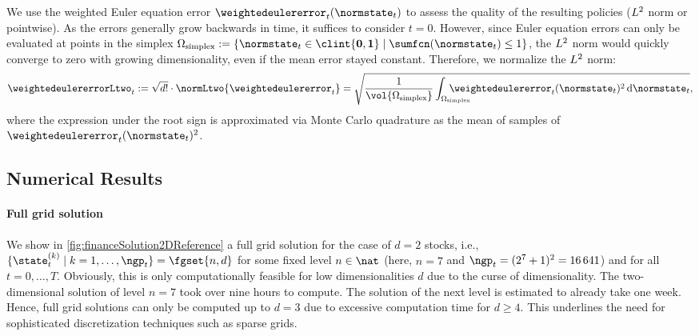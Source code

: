 We use the weighted Euler equation error
$\weightedeulererror_t(\normstate_t)$
to assess the quality of the resulting policies
($L^2$ norm or pointwise).
As the errors generally grow backwards in time,
it suffices to consider $t = 0$.
However, since Euler equation errors can only be evaluated at points in
the simplex
$
  \Omega_\mathrm{simplex}
  := \{\normstate_t \in \clint{\*0, \*1} \mid \sumfcn(\normstate_t) \le 1\}
$, the $L^2$ norm would
quickly converge to zero with growing dimensionality, even if the mean error
stayed constant.
Therefore, we normalize the $L^2$ norm:
\begin{equation}
  \weightedeulererrorLtwo_t
  := \sqrt{d!} \cdot \normLtwo{\weightedeulererror_t}
  = \sqrt{
    \frac{1}{\vol{\Omega_\mathrm{simplex}}}
    \int_{\mathrlap{\Omega_\mathrm{simplex}}\hphantom{\Omega}}
    \weightedeulererror_t(\normstate_t)^2 \diff{}\normstate_t
  },
\end{equation}
where the expression under the root sign is approximated
via Monte Carlo quadrature as the mean of samples
of $\weightedeulererror_t(\normstate_t)^2$.



\subsection{Numerical Results}
\label{sec:843results}

\paragraph{Full grid solution}

We show in \cref{fig:financeSolution2DReference}
a full grid solution for the case of $d = 2$ stocks,
i.e., $\{\state_t^{(k)} \mid k = 1, \dotsc, \ngp_t\} = \fgset{n,d}$
for some fixed level $n \in \nat$
(here, $n = 7$ and $\ngp_t = (2^7 + 1)^2 = \num{16641}$) and
for all $t = 0, \dotsc, T$.
Obviously, this is only computationally feasible
for low dimensionalities $d$ due to the curse of dimensionality.
The two-dimensional solution of level $n = 7$
took over nine hours to compute.
The solution of the next level is estimated to already take one week.
Hence, full grid solutions can only be computed up to $d = 3$
due to excessive computation time for $d \ge 4$.
This underlines the need for sophisticated
discretization techniques such as sparse grids.

